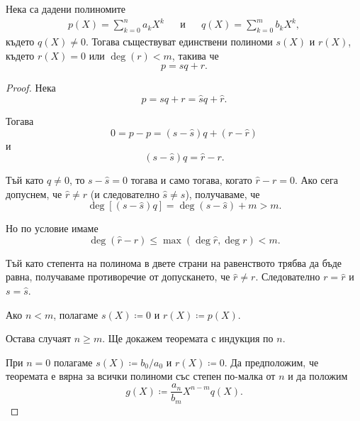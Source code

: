 \documentclass{../../common/topic}
\begin{document}
\begin{theorem}\label{thm:polynomial_division}
  Нека са дадени полиномите
  \begin{align*}
    p(X) = \sum_{k=0}^n a_k X^k &&\text{и}&& q(X) = \sum_{k=0}^m b_k X^k,
  \end{align*}
  където \( q(X) \neq 0 \). Тогава съществуват единствени полиноми \( s(X) \) и \( r(X) \), където \( r(X) = 0 \) или \( \deg(r) < m \), такива че
  \begin{equation*}
    p = sq + r.
  \end{equation*}
\end{theorem}
\begin{proof}
  \UniquenessSubProof Нека
  \begin{equation*}
    p = sq + r = \hat sq + \hat r.
  \end{equation*}

  Тогава
  \begin{equation*}
    0 = p - p = (s - \hat s) q + (r - \hat r)
  \end{equation*}
  и
  \begin{equation*}
    (s - \hat s) q = \hat r - r.
  \end{equation*}

  Тъй като \( q \neq 0 \), то \( s - \hat s = 0 \) тогава и само тогава, когато \( \hat r - r = 0 \). Ако сега допуснем, че \( \hat r \neq r \) (и следователно \( \hat s \neq s \)), получаваме, че
  \begin{equation*}
    \deg[(s - \hat s) q] = \deg(s - \hat s) + m > m.
  \end{equation*}

  Но по условие имаме
  \begin{equation*}
    \deg(\hat r - r) \leq \max(\deg \hat r, \deg r) < m.
  \end{equation*}

  Тъй като степента на полинома в двете страни на равенството трябва да бъде равна, получаваме противоречие от допускането, че \( \hat r \neq r \). Следователно \( r = \hat r \) и \( s = \hat s \).

  \ExistenceSubProof Ако \( n < m \), полагаме \( s(X) \coloneqq 0 \) и \( r(X) \coloneqq p(X) \).

  Остава случаят \( n \geq m \). Ще докажем теоремата с индукция по \( n \).

  При \( n = 0 \) полагаме \( s(X) \coloneqq b_0 / a_0 \) и \( r(X) \coloneqq 0 \). Да предположим, че теоремата е вярна за всички полиноми със степен по-малка от \( n \) и да положим
  \begin{equation*}
    g(X) \coloneqq \frac {a_n} {b_m} X^{n-m} q(X).
  \end{equation*}


\end{proof}
\end{document}
